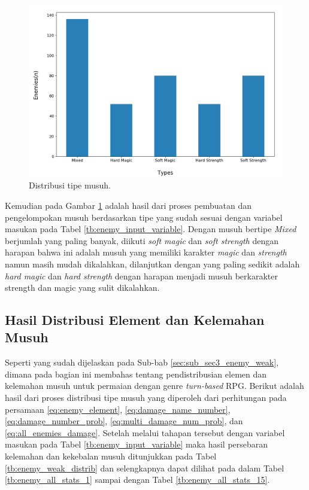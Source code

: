 \begin{figure} [!h] \centering
	\includegraphics[scale=0.5]{img/EnemyTypeDistrib.png}
	\caption{Distribusi tipe musuh.}
	\label{fig:enemy_type_distrib}
\end{figure}

Kemudian pada Gambar \ref{fig:enemy_type_distrib} adalah hasil dari proses pembuatan dan pengelompokan musuh berdasarkan tipe yang sudah sesuai dengan variabel masukan pada Tabel \ref{tb:enemy_input_variable}. Dengan musuh bertipe \textit{Mixed} berjumlah yang paling banyak, diikuti \textit{soft magic} dan \textit{soft strength} dengan harapan bahwa ini adalah musuh yang memiliki karakter \textit{magic} dan \textit{strength} namun masih mudah dikalahkan, dilanjutkan dengan yang paling sedikit adalah \textit{hard magic} dan \textit{hard strength} dengan harapan menjadi musuh berkarakter strength dan magic yang sulit dikalahkan.
\vspace{1ex}

\subsection{Hasil Distribusi Element dan Kelemahan Musuh}
\label{sec:sub_sec4_eval_dist_enemy_element_and_weak}
\vspace{1ex}

Seperti yang sudah dijelaskan pada Sub-bab \ref{sec:sub_sec3_enemy_weak}, dimana pada bagian ini membahas tentang pendistribusian elemen dan kelemahan musuh untuk permaian dengan genre \textit{turn-based} RPG. Berikut adalah hasil dari proses distribusi tipe musuh yang diperoleh dari perhitungan pada persamaan \ref{eq:enemy_element}, \ref{eq:damage_name_number}, \ref{eq:damage_number_prob}, \ref{eq:multi_damage_num_prob}, dan \ref{eq:all_enemies_damage}. Setelah melalui tahapan tersebut dengan variabel masukan pada Tabel \ref{tb:enemy_input_variable} maka hasil persebaran kelemahan dan kekebalan musuh ditunjukkan pada Tabel \ref{tb:enemy_weak_distrib} dan selengkapnya dapat dilihat pada  dalam Tabel \ref{tb:enemy_all_stats_1} sampai dengan Tabel \ref{tb:enemy_all_stats_15}.
\vspace{-1ex}

